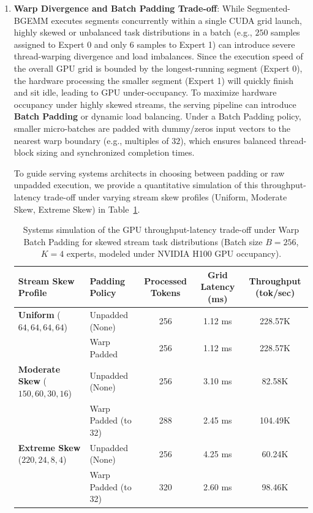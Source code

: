 \documentclass{article}
\theoremstyle{plain}
\theoremstyle{definition}
\theoremstyle{remark}
\begin{document}
\begin{enumerate}
    \item \textbf{Warp Divergence and Batch Padding Trade-off}: While Segmented-BGEMM executes segments concurrently within a single CUDA grid launch, highly skewed or unbalanced task distributions in a batch (e.g., $250$ samples assigned to Expert 0 and only $6$ samples to Expert 1) can introduce severe thread-warping divergence and load imbalances. Since the execution speed of the overall GPU grid is bounded by the longest-running segment (Expert 0), the hardware processing the smaller segment (Expert 1) will quickly finish and sit idle, leading to GPU under-occupancy. To maximize hardware occupancy under highly skewed streams, the serving pipeline can introduce \textbf{Batch Padding} or dynamic load balancing. Under a Batch Padding policy, smaller micro-batches are padded with dummy/zeros input vectors to the nearest warp boundary (e.g., multiples of $32$), which ensures balanced thread-block sizing and synchronized completion times. 

    To guide serving systems architects in choosing between padding or raw unpadded execution, we provide a quantitative simulation of this throughput-latency trade-off under varying stream skew profiles (Uniform, Moderate Skew, Extreme Skew) in Table~\ref{tab:warp_padding_tradeoff}.

    \begin{table}[htbp]
    \centering
    \caption{Systems simulation of the GPU throughput-latency trade-off under Warp Batch Padding for skewed stream task distributions (Batch size $B=256$, $K=4$ experts, modeled under NVIDIA H100 GPU occupancy).}
    \label{tab:warp_padding_tradeoff}
    \vskip 0.15in
    \setlength{\tabcolsep}{3pt}
    \small
    \begin{tabular}{llccc}
    \toprule
    Stream Skew Profile & Padding Policy & Processed Tokens & Grid Latency (ms) & Throughput (tok/sec) \\
    \midrule
    \textbf{Uniform} ($64,64,64,64$) & Unpadded (None) & 256 & 1.12 ms & 228.57K \\
    & Warp Padded & 256 & 1.12 ms & 228.57K \\
    \midrule
    \textbf{Moderate Skew} ($150,60,30,16$) & Unpadded (None) & 256 & 3.10 ms & 82.58K \\
    & Warp Padded (to 32) & 288 & 2.45 ms & 104.49K \\
    \midrule
    \textbf{Extreme Skew} ($220,24,8,4$) & Unpadded (None) & 256 & 4.25 ms & 60.24K \\
    & Warp Padded (to 32) & 320 & 2.60 ms & 98.46K \\
    \bottomrule
    \end{tabular}
    \end{table}


\end{enumerate}
\end{document}
